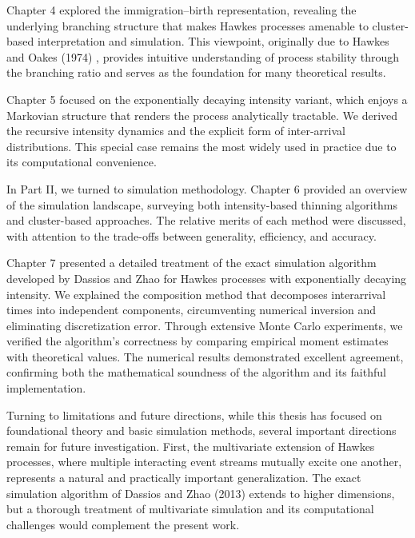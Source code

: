 \documentclass[12pt,a4paper]{report}
\theoremstyle{plain}
\theoremstyle{definition}
\theoremstyle{remark}
\newcommand{\1}{\mathbf{1}}
\begin{document}
\medskip
\noindent
Chapter 4 explored the immigration--birth representation, revealing the underlying branching structure that makes Hawkes processes amenable to cluster-based interpretation and simulation. This viewpoint, originally due to Hawkes and Oakes (1974) \cite{HO74}, provides intuitive understanding of process stability through the branching ratio and serves as the foundation for many theoretical results.

\medskip
\noindent
Chapter 5 focused on the exponentially decaying intensity variant, which enjoys a Markovian structure that renders the process analytically tractable. We derived the recursive intensity dynamics and the explicit form of inter-arrival distributions. This special case remains the most widely used in practice due to its computational convenience.

\medskip
\noindent
In Part II, we turned to simulation methodology. Chapter 6 provided an overview of the simulation landscape, surveying both intensity-based thinning algorithms and cluster-based approaches. The relative merits of each method were discussed, with attention to the trade-offs between generality, efficiency, and accuracy.

\medskip
\noindent
Chapter 7 presented a detailed treatment of the exact simulation algorithm developed by Dassios and Zhao \cite{DZ13} for Hawkes processes with exponentially decaying intensity. We explained the composition method that decomposes interarrival times into independent components, circumventing numerical inversion and eliminating discretization error. Through extensive Monte Carlo experiments, we verified the algorithm's correctness by comparing empirical moment estimates with theoretical values. The numerical results demonstrated excellent agreement, confirming both the mathematical soundness of the algorithm and its faithful implementation.

\medskip
\medskip
\noindent
Turning to limitations and future directions, while this thesis has focused on foundational theory and basic simulation methods, several important directions remain for future investigation. First, the multivariate extension of Hawkes processes, where multiple interacting event streams mutually excite one another, represents a natural and practically important generalization. The exact simulation algorithm of Dassios and Zhao (2013) \cite{DZ13} extends to higher dimensions, but a thorough treatment of multivariate simulation and its computational challenges would complement the present work.
\end{document}
